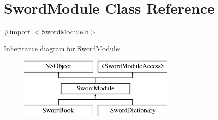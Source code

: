 \hypertarget{interface_sword_module}{\section{Sword\-Module Class Reference}
\label{interface_sword_module}
}


{\ttfamily \#import $<$Sword\-Module.\-h$>$}

Inheritance diagram for Sword\-Module\-:\begin{figure}[H]
\begin{center}
\leavevmode
\includegraphics[height=3.000000cm]{interface_sword_module}
\end{center}
\end{figure}
